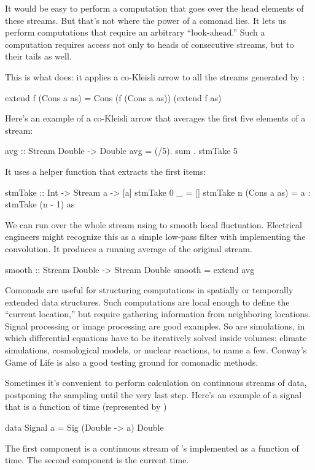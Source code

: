 \documentclass[DaoFP]{subfiles}
\begin{document}
It would be easy to perform a computation that goes over the head elements of these streams. But that's not where the power of a comonad lies. It lets us perform computations that require an arbitrary ``look-ahead.''  Such a computation requires access not only to heads of consecutive streams, but to their tails as well.

This is what  does: it applies a co-Kleisli arrow to all the streams generated by :
\begin{haskell}
  extend f (Cons a as) = Cons (f (Cons a as)) (extend f as)
\end{haskell}

Here's an example of a co-Kleisli arrow that averages the first five elements of a stream:
\begin{haskell}
avg :: Stream Double -> Double
avg  = (/5). sum . stmTake 5
\end{haskell}
It uses a helper function that extracts the first  items:
\begin{haskell}
stmTake :: Int -> Stream a -> [a]
stmTake 0 _ = []
stmTake n (Cons a as) = a : stmTake (n - 1) as
\end{haskell}

We can run  over the whole stream using  to smooth local fluctuation. Electrical engineers might recognize this as a simple low-pass filter with  implementing the convolution. It produces a running average of the original stream. 
\begin{haskell}
smooth :: Stream Double -> Stream Double
smooth = extend avg
\end{haskell}


Comonads are useful for structuring computations in spatially or temporally extended data structures. Such computations are local enough to define the ``current location,'' but require gathering information from neighboring locations. Signal processing or image processing are good examples. So are simulations, in which differential equations have to be iteratively solved inside volumes: climate simulations, cosmological models, or nuclear reactions, to name a few. Conway's Game of Life is also a good testing ground for comonadic methods.

Sometimes it's convenient to perform calculation on continuous streams of data, postponing the sampling until the very last step. Here's an example of a signal that is a function of time (represented by )
\begin{haskell}
data Signal a = Sig (Double -> a) Double
\end{haskell}
The first component is a continuous stream of 's implemented as a function of time. The second component is the current time.
\end{document}
